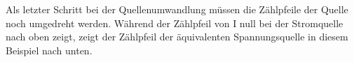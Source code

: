 \begin{frame}
{{			Als letzter Schritt bei der Quellenumwandlung müssen die Zählpfeile der Quelle noch umgedreht werden. Während der Zählpfeil von I null bei der Stromquelle nach oben zeigt, zeigt der Zählpfeil
			der äquivalenten Spannungsquelle in diesem Beispiel nach unten. 
		}
		
		
	}
\end{frame}













%
%
%
%
%
%
%
%



